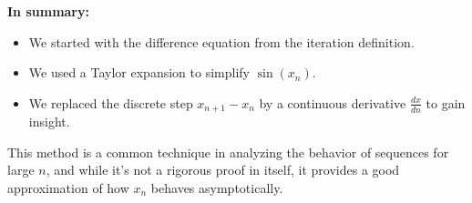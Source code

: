 \documentclass[a4paper,12pt]{article}
\begin{document}
\textbf{In summary:}

\begin{itemize}
\item 
We started with the difference equation from the iteration definition.

\item 
We used a Taylor expansion to simplify \(\sin(x_n)\).

\item 
We replaced the discrete step \(x_{n+1}-x_n\) by a continuous derivative \(\frac{dx}{dn}\) to gain insight.

\end{itemize}

This method is a common technique in analyzing the behavior of sequences for large \(n\), and while it's not a rigorous proof in itself, it provides a good approximation of how \(x_n\) behaves asymptotically.
\end{document}
